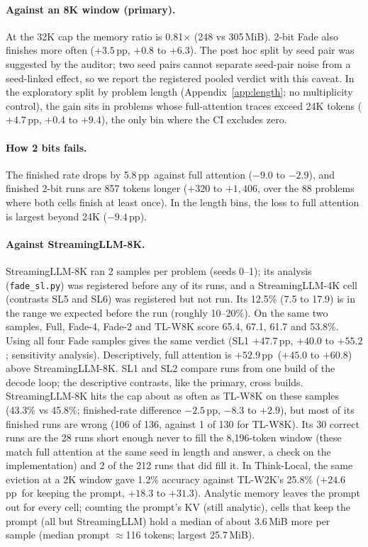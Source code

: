 \documentclass{article}
\newcommand{\pp}{\,pp}
\begin{document}
\paragraph{Against an 8K window (primary).} At the 32K cap the memory ratio is 0.81$\times$ (248 vs 305\,MiB). 2-bit Fade also finishes more often ($+3.5$\pp, $+0.8$ to $+6.3$). The post hoc split by seed pair was suggested by the auditor; two seed pairs cannot separate seed-pair noise from a seed-linked effect, so we report the registered pooled verdict with this caveat. In the exploratory split by problem length (Appendix~\ref{app:length}; no multiplicity control), the gain sits in problems whose full-attention traces exceed 24K tokens ($+4.7$\pp, $+0.4$ to $+9.4$), the only bin where the CI excludes zero.

\paragraph{How 2 bits fails.} The finished rate drops by 5.8\pp\ against full attention ($-9.0$ to $-2.9$), and finished 2-bit runs are 857 tokens longer ($+320$ to $+1{,}406$, over the 88 problems where both cells finish at least once). In the length bins, the loss to full attention is largest beyond 24K ($-9.4$\pp).

\paragraph{Against StreamingLLM-8K.} StreamingLLM-8K ran 2 samples per problem (seeds 0--1); its analysis (\texttt{fade\_sl.py}) was registered before any of its runs, and a StreamingLLM-4K cell (contrasts SL5 and SL6) was registered but not run. Its 12.5\% (7.5 to 17.9) is in the range we expected before the run (roughly 10--20\%). On the same two samples, Full, Fade-4, Fade-2 and TL-W8K score 65.4, 67.1, 61.7 and 53.8\%. Using all four Fade samples gives the same verdict (SL1 $+47.7$\pp, $+40.0$ to $+55.2$; sensitivity analysis). Descriptively, full attention is $+52.9$\pp\ ($+45.0$ to $+60.8$) above StreamingLLM-8K. SL1 and SL2 compare runs from one build of the decode loop; the descriptive contrasts, like the primary, cross builds. StreamingLLM-8K hits the cap about as often as TL-W8K on these samples (43.3\% vs 45.8\%; finished-rate difference $-2.5$\pp, $-8.3$ to $+2.9$), but most of its finished runs are wrong (106 of 136, against 1 of 130 for TL-W8K). Its 30 correct runs are the 28 runs short enough never to fill the 8,196-token window (these match full attention at the same seed in length and answer, a check on the implementation) and 2 of the 212 runs that did fill it. In Think-Local, the same eviction at a 2K window gave 1.2\% accuracy against TL-W2K's 25.8\% ($+24.6$\pp\ for keeping the prompt, $+18.3$ to $+31.3$). Analytic memory leaves the prompt out for every cell; counting the prompt's KV (still analytic), cells that keep the prompt (all but StreamingLLM) hold a median of about 3.6\,MiB more per sample (median prompt ${\approx}$116 tokens; largest 25.7\,MiB).
\end{document}
